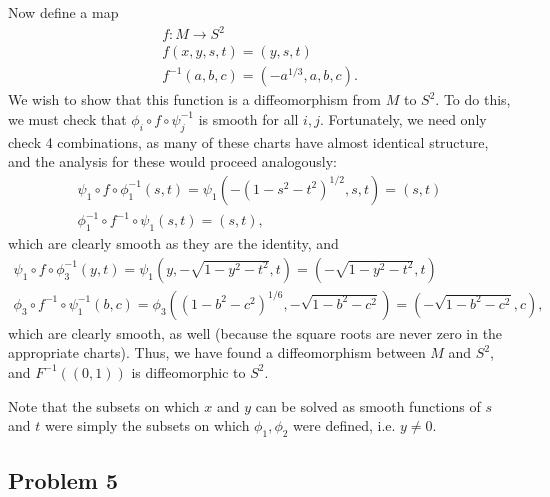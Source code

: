 \documentclass{../../mathnotes}
\begin{document}
Now define a map
\begin{align*}
    f:M\to S^2\\
    f(x,y,s,t)=(y,s,t)\\
    f^{-1}(a,b,c)=(-a^{1/3},a,b,c).
\end{align*}
We wish to show that this function is a diffeomorphism from $M$ to $S^2$. To do this, we must check that $\phi_i\circ f\circ\psi_j^{-1}$ is smooth
for all $i,j$. Fortunately, we need only check 4 combinations, as many of these charts have almost identical structure, and the analysis for these
would proceed analogously:
\begin{align*}
    \psi_1\circ f\circ\phi_1^{-1}(s,t)=\psi_1\left( -(1-s^2-t^2)^{1/2},s,t \right)=(s,t)\\
    \phi_1^{-1}\circ f^{-1}\circ\psi_1(s,t)=(s,t),
\end{align*}
which are clearly smooth as they are the identity, and
\begin{align*}
    \psi_1\circ f\circ\phi_3^{-1}(y,t)=\psi_1\left( y,-\sqrt{1-y^2-t^2},t \right)=\left( -\sqrt{1-y^2-t^2},t \right)\\
    \phi_3\circ f^{-1}\circ \psi_1^{-1}(b,c)=\phi_3\left( (1-b^2-c^2)^{1/6},-\sqrt{1-b^2-c^2} \right)=\left( -\sqrt{1-b^2-c^2},c \right),
\end{align*}
which are clearly smooth, as well (because the square roots are never zero in the appropriate charts). Thus, we have found a
diffeomorphism between $M$ and $S^2$, and $F^{-1}( (0,1) )$ is diffeomorphic to $S^2$.

Note that the subsets on which $x$ and $y$ can be solved as smooth functions of $s$ and $t$ were simply the subsets on which
$\phi_1,\phi_2$ were defined, i.e. $y\neq 0$.

\subsection*{Problem 5}
\end{document}
